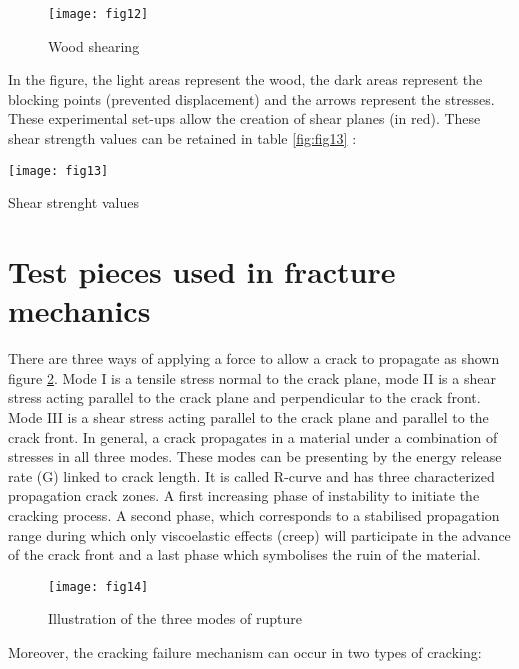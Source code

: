 \graphicspath{{Images/}}
\begin{figure}[htp]
	\centering
	\texttt{[image: fig12]}
	\caption{Wood shearing}
	\label{fig:fig12}
\end{figure}

In the figure, the light areas represent the wood, the dark areas represent the blocking points (prevented displacement) and the arrows represent the stresses. These experimental set-ups allow the creation of shear planes (in red). These shear strength values can be retained in table \ref{fig:fig13} :

\graphicspath{{Images/}}
\begin{table}[htp]
	\centering
	\texttt{[image: fig13]}
	\caption{Shear strenght values}
	\label{fig:fig13}
\end{table}

\section{Test pieces used in fracture mechanics}

There are three ways of applying a force to allow a crack to propagate as shown figure \ref{fig:fig14}. Mode I is a tensile stress normal to the crack plane, mode II is a shear stress acting parallel to the crack plane and perpendicular to the crack front. Mode III is a shear stress acting parallel to the crack plane and parallel to the crack front. In general, a crack propagates in a material under a combination of stresses in all three modes. These modes can be presenting by the energy release rate (G) linked to crack length. It is called R-curve and has three characterized propagation crack zones. A first increasing phase of instability to initiate the cracking process. A second phase, which corresponds to a stabilised propagation range during which only viscoelastic effects (creep) will participate in the advance of the crack front and a last phase which symbolises the ruin of the material.

\graphicspath{{Images/}}
\begin{figure}[htp]
	\centering
	\texttt{[image: fig14]}
	\caption{Illustration of the three modes of rupture}
	\label{fig:fig14}
\end{figure}

Moreover, the cracking failure mechanism can occur in two types of cracking: 

